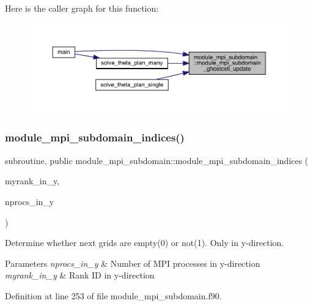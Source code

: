 Here is the caller graph for this function\+:\nopagebreak
\begin{figure}[H]
\begin{center}
\leavevmode
\includegraphics[width=350pt]{namespacemodule__mpi__subdomain_a3e13201bdd812e62d2293bb0e2c2221d_icgraph}
\end{center}
\end{figure}
\mbox{\label{namespacemodule__mpi__subdomain_a407d55f604c25fca086515a66980f67b}} 
\subsubsection{\texorpdfstring{module\_mpi\_subdomain\_indices()}{module\_mpi\_subdomain\_indices()}}
{\footnotesize\ttfamily subroutine, public module\+\_\+mpi\+\_\+subdomain\+::module\+\_\+mpi\+\_\+subdomain\+\_\+indices (\begin{DoxyParamCaption}\item[{integer, intent(in)}]{myrank\+\_\+in\+\_\+y,  }\item[{integer, intent(in)}]{nprocs\+\_\+in\+\_\+y }\end{DoxyParamCaption})}



Determine whether next grids are empty(0) or not(1). Only in y-\/direction. 


\begin{DoxyParams}{Parameters}
{\em nprocs\+\_\+in\+\_\+y} & Number of M\+PI processes in y-\/direction \\
\hline
{\em myrank\+\_\+in\+\_\+y} & Rank ID in y-\/direction \\
\hline
\end{DoxyParams}


Definition at line 253 of file module\+\_\+mpi\+\_\+subdomain.\+f90.


